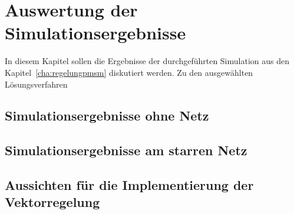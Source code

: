 
\chapter{Auswertung der Simulationsergebnisse}
\label{chap:ergebnisse-foc}

In diesem Kapitel sollen die Ergebnisse der durchgeführten Simulation aus den Kapitel~\ref{cha:regelungpmsm} diskutiert werden.
Zu den ausgewählten Lösungsverfahren 

\section{Simulationsergebnisse ohne Netz}\label{sec:sim-ohne-netz}


\section{Simulationsergebnisse am starren Netz}\label{sec:sim-starr-netz}


\section{Aussichten für die Implementierung der Vektorregelung}\label{sec:aussichten-foc}





